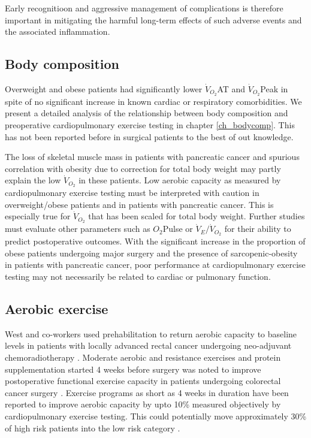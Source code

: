 Early recognitioon and aggressive management of complications is therefore important in mitigating the harmful long-term effects of such adverse events and the associated inflammation. 

\subsection{Body composition}
Overweight and obese patients had significantly lower $\dot{V}_{O_2}$AT and $\dot{V}_{O_2}$Peak in spite of no significant increase in known cardiac or respiratory comorbidities. 
We present a detailed analysis of the relationship between body composition and preoperative cardiopulmonary exercise testing in chapter \ref{ch_bodycomp}.
This has not been reported before in surgical patients to the best of out knowledge. 

The loss of skeletal muscle mass in patients with pancreatic cancer and spurious correlation with obesity due to correction for total body weight may partly explain the low $\dot{V}_{O_2}$ in these patients. 
Low aerobic capacity as measured by cardiopulmonary exercise testing must be interpreted with caution in overweight/obese patients and in patients with pancreatic cancer. 
This is especially true for $\dot{V}_{O_2}$ that has been scaled for total body weight.
Further studies must evaluate other parameters such as $O_2$Pulse or $\dot{V}_E/\dot{V}_{O_2}$ for their ability to predict postoperative outcomes. 
With the significant increase in the proportion of obese patients undergoing major surgery and the presence of sarcopenic-obesity in patients with pancreatic cancer, poor performance at cardiopulmonary exercise testing may not necessarily be related to cardiac or pulmonary function. 

\subsection{Aerobic exercise}

West and co-workers used prehabilitation to return aerobic capacity to baseline levels in patients with locally advanced rectal cancer undergoing neo-adjuvant chemoradiotherapy \parencite{west_effect_2015}.
Moderate aerobic and resistance exercises and protein supplementation started 4 weeks before surgery was noted to improve postoperative functional exercise capacity in patients undergoing colorectal cancer surgery \parencite{gillis_prehabilitation_2014}.
Exercise programs as short as 4 weeks in duration have been reported to improve aerobic capacity by upto 10\%  measured objectively by cardiopulmonary exercise testing.
This could potentially move approximately 30\% of high risk patients into the low risk category \parencite{dunne_pmo-029_2012}.

